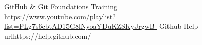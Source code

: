\begin{thebibliography}{99999}
{} GitHub & Git Foundations Training \\\url{https://www.youtube.com/playlist?list=PLg7s6cbtAD15G8lNyoaYDuKZSKyJrgwB-}
 Github Help \\url{https://help.github.com/}
\end{thebibliography}
